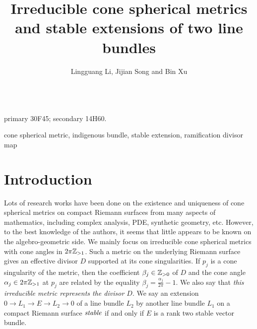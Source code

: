 \documentclass[12pt]{article}
\title{\bfseries Irreducible cone spherical metrics and stable extensions of two line bundles}
\author{Lingguang Li, Jijian Song and Bin Xu}
\begin{document}
\maketitle

\\

 {\small primary 30F45; secondary 14H60.}

 {\small cone spherical metric, indigenous bundle, stable extension, ramification divisor map}


\section{Introduction}
\label{Intro}
Lots of research works have been done on the existence and uniqueness of cone spherical metrics on compact Riemann surfaces from many aspects of mathematics, including complex analysis, PDE, synthetic geometry, etc. However, to the best knowledge of the authors, it seems that little appears to be known on the algebro-geometric side. We mainly focus on irreducible cone spherical metrics with cone angles in $2\pi{\Bbb Z}_{>1}$. Such a metric on the underlying Riemann surface gives an effective divisor $D$ supported at its cone singularities. If $p_{j}$ is a cone singularity of the metric, then the coefficient $ \beta_{j} \in {\Bbb Z}_{>0}$ of $D$ and the cone angle $\alpha_{j} \in 2\pi{\Bbb Z}_{>1}$ at $p_{j}$ are related by the equality $\beta_{j} = \frac{\alpha_{j}}{2\pi}-1$. We also say that {\it this irreducible metric represents the divisor $D$}.
We say an extension $0\to L_1\to E\to L_2\to 0$ of a line bundle $L_2$ by another line bundle $L_1$ on a compact Riemann surface ${\it stable}$ if and only if $E$ is a rank two stable vector bundle.
\end{document}
